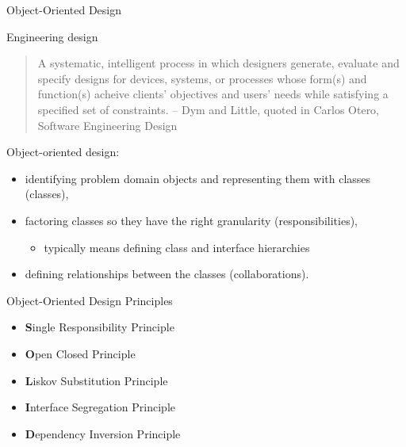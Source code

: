 \documentclass{beamer}
\author[Chris Simpkins] 
{Christopher Simpkins \\\texttt{chris.simpkins@gatech.edu}}
\institute[Georgia Tech] %
\date[CS 1331]{}
\begin{document}
\begin{frame}
  \titlepage
\end{frame}



\begin{frame}[fragile]{Object-Oriented Design}


Engineering design
\begin{quote}
A systematic, intelligent process in which designers generate, evaluate and specify designs for devices, systems, or processes whose form(s) and function(s) acheive clients' objectives and users' needs while satisfying a specified set of constraints. -- Dym and Little, quoted in Carlos Otero, Software Engineering Design
\end{quote}
Object-oriented design:
\begin{itemize}
\item identifying problem domain objects and representing them with classes (classes),
\item factoring classes so they have the right granularity (responsibilities),
\begin{itemize}
\item typically means defining class and interface hierarchies
\end{itemize}
\item defining relationships between the classes (collaborations).
\end{itemize}
\end{frame}

\begin{frame}[fragile]{Object-Oriented Design Principles}

\begin{itemize}
\item {\bf S}ingle Responsibility Principle
\item {\bf O}pen Closed Principle
\item {\bf L}iskov Substitution Principle
\item {\bf I}nterface Segregation Principle
\item {\bf D}ependency Inversion Principle
\end{itemize}

\end{frame}
\end{document}
